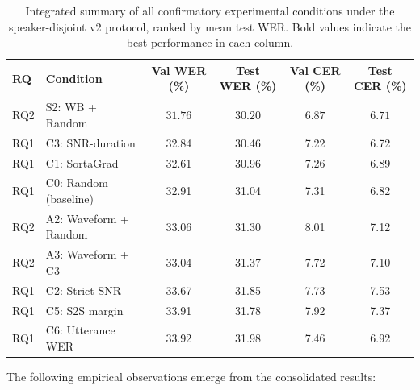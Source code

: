 \begin{table}[H]
\centering
\caption{Integrated summary of all confirmatory experimental conditions under
the speaker-disjoint v2 protocol, ranked by mean test WER. Bold values indicate
the best performance in each column.}
\label{tab:integrated-summary}
\begin{tabular}{llcccc}
\hline
\textbf{RQ} & \textbf{Condition} & \textbf{Val WER (\%)} & \textbf{Test WER (\%)} & \textbf{Val CER (\%)} & \textbf{Test CER (\%)} \\
\hline
RQ2 & S2: WB + Random          & $\mathbf{31.76}$ & $\mathbf{30.20}$ & $\mathbf{6.87}$ & $\mathbf{6.71}$ \\
RQ1 & C3: SNR-duration         & 32.84 & 30.46 & 7.22 & 6.72 \\
RQ1 & C1: SortaGrad            & 32.61 & 30.96 & 7.26 & 6.89 \\
RQ1 & C0: Random (baseline)    & 32.91 & 31.04 & 7.31 & 6.82 \\
RQ2 & A2: Waveform + Random    & 33.06 & 31.30 & 8.01 & 7.12 \\
RQ2 & A3: Waveform + C3        & 33.04 & 31.37 & 7.72 & 7.10 \\
RQ1 & C2: Strict SNR           & 33.67 & 31.85 & 7.73 & 7.53 \\
RQ1 & C5: S2S margin           & 33.91 & 31.78 & 7.92 & 7.37 \\
RQ1 & C6: Utterance WER        & 33.92 & 31.98 & 7.46 & 6.92 \\
\hline
\end{tabular}
\end{table}

The following empirical observations emerge from the consolidated results:

